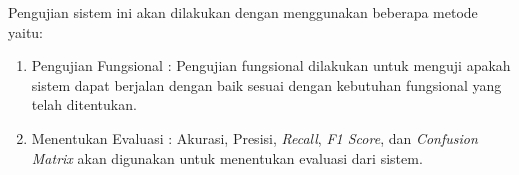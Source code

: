 Pengujian sistem ini akan dilakukan dengan menggunakan beberapa metode yaitu:
\begin{enumerate}
    \item Pengujian Fungsional : Pengujian fungsional dilakukan untuk menguji apakah sistem dapat berjalan dengan baik sesuai dengan kebutuhan fungsional yang telah ditentukan.
    \item Menentukan Evaluasi : Akurasi, Presisi, \textit{Recall}, \textit{F1 Score}, dan \textit{Confusion Matrix} akan digunakan untuk menentukan evaluasi dari sistem.
\end{enumerate}